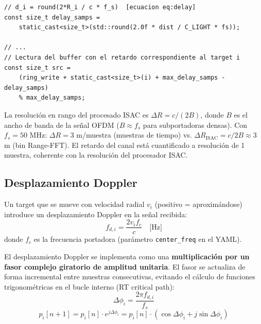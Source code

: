 \documentclass[11pt,a4paper]{article}
\begin{document}
\begin{lstlisting}[style=cpp,
  caption={Cálculo del retardo y lectura desde el buffer — ChannelSimulator.cpp, líneas 129--130 y 156--159}]
// d_i = round(2*R_i / c * f_s)  [ecuacion eq:delay]
const size_t delay_samps =
    static_cast<size_t>(std::round(2.0f * dist / C_LIGHT * fs));

// ...
// Lectura del buffer con el retardo correspondiente al target i
const size_t src =
    (ring_write + static_cast<size_t>(i) + max_delay_samps - delay_samps)
    % max_delay_samps;
\end{lstlisting}

\begin{infobox}
La resolución en rango del procesado ISAC es $\Delta R = c / (2B)$, donde $B$ es el
ancho de banda de la señal OFDM ($B \approx f_s$ para subportadoras densas). Con
$f_s = 50$ MHz: $\Delta R = 3$ m/muestra (muestras de tiempo) vs.
$\Delta R_\text{ISAC} = c/2B \approx 3$ m (bin Range-FFT). El retardo del canal
está cuantificado a resolución de 1 muestra, coherente con la resolución del
procesador ISAC.
\end{infobox}

\subsection{Desplazamiento Doppler}

Un target que se mueve con velocidad radial $v_i$ (positivo = aproximándose)
introduce un desplazamiento Doppler en la señal recibida:
\begin{equation}
  f_{d,i} = \frac{2 v_i f_c}{c} \quad \text{[Hz]}
  \label{eq:doppler_freq}
\end{equation}
donde $f_c$ es la frecuencia portadora (parámetro \texttt{center\_freq} en el YAML).

El desplazamiento Doppler se implementa como una \textbf{multiplicación por un fasor
complejo giratorio de amplitud unitaria}. El fasor se actualiza de forma incremental
entre muestras consecutivas, evitando el cálculo de funciones trigonométricas en el
bucle interno (RT critical path):
\begin{equation}
  \Delta\phi_i = \frac{2\pi f_{d,i}}{f_s}
  \label{eq:doppler_phi}
\end{equation}
\begin{equation}
  p_i[n+1] = p_i[n] \cdot e^{j\Delta\phi_i} = p_i[n] \cdot (\cos\Delta\phi_i + j\sin\Delta\phi_i)
  \label{eq:doppler_phasor}
\end{equation}
\end{document}
